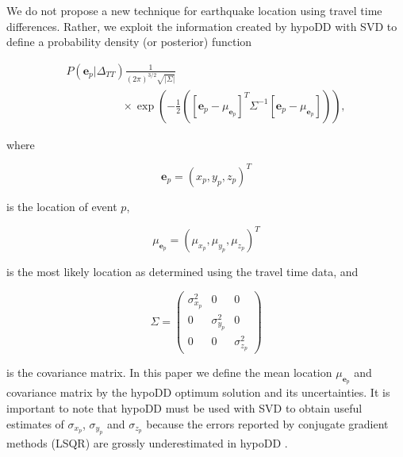 \documentclass[12pt,double]{article}
\begin{document}
We do not propose a new technique for earthquake location using
travel time differences. Rather, we exploit the information created
by hypoDD with SVD to define a probability density (or posterior)
function
\begin{linenomath*} \begin{equation}
\label{eq-multi-var-Gauss-tt}
\begin{array}{l}
P(\mathbf{e}_p|\Delta_{TT})
\frac{1}{(2\pi)^{3/2}\sqrt{|\Sigma|}} \\
\hspace{5em} \times \exp
\left({-\frac{1}{2}\left([\mathbf{e}_p-\mu_{\mathbf{e}_p}]^T
\Sigma^{-1} [\mathbf{e}_p-\mu_{\mathbf{e}_p}]\right)} \right),
\end{array}
\end{equation} \end{linenomath*}
where
\begin{linenomath*} \begin{equation}
\mathbf{e}_p = (x_p,y_p,z_p)^T
\end{equation} \end{linenomath*}
is the location of event $p$,
\begin{linenomath*} \begin{equation}
\mu_{\mathbf{e}_p} = (\mu_{x_p}, \mu_{y_p},\mu_{z_p})^T
\end{equation} \end{linenomath*}
is the most likely location as determined using the travel time
data, and
\begin{linenomath*} \begin{equation}
\label{eq:Sigma-expression}
\Sigma = \left( \begin{array}{ccc} \sigma_{x_p}^2 & 0 & 0\\
0 &  \sigma_{y_p}^2 & 0 \\
0 & 0 & \sigma_{z_p}^2  \end{array} \right)
\end{equation} \end{linenomath*}
is the covariance matrix. In this paper we define the mean location
$\mu_{\mathbf{e}_p}$ and covariance matrix by the hypoDD optimum
solution and its uncertainties. It is important to note that hypoDD
must be used with SVD to obtain useful estimates of $\sigma_{x_p}$,
$\sigma_{y_p}$ and $\sigma_{z_p}$ because the errors reported by
conjugate gradient methods (LSQR) are grossly underestimated in
hypoDD \citep{dr_Waldhauser01a}.
\end{document}
